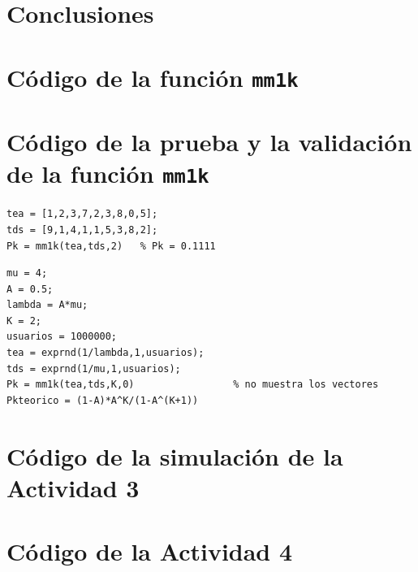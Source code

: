 \documentclass[12pt]{article}
\begin{document}
\section{Conclusiones}

\printbibliography[title={Referencias}]

\newpage
\appendix
\renewcommand{\lstlistingname}{Código}

\section{Código de la función \texttt{mm1k}}\label{anexo:mm1k}


\section{Código de la prueba y la validación de la función \texttt{mm1k}}\label{anexo:pruebas}

\begin{lstlisting}[caption={Prueba de \texttt{mm1k} con los vectores de clase.}]
tea = [1,2,3,7,2,3,8,0,5];
tds = [9,1,4,1,1,5,3,8,2];
Pk = mm1k(tea,tds,2)   % Pk = 0.1111
\end{lstlisting}

\begin{lstlisting}[caption={Validación de \texttt{mm1k} con tiempos exponenciales.}]
mu = 4;
A = 0.5;
lambda = A*mu;
K = 2;
usuarios = 1000000;
tea = exprnd(1/lambda,1,usuarios);
tds = exprnd(1/mu,1,usuarios);
Pk = mm1k(tea,tds,K,0)                 % no muestra los vectores
Pkteorico = (1-A)*A^K/(1-A^(K+1))
\end{lstlisting}

\section{Código de la simulación de la Actividad 3}\label{anexo:actividad3}


\section{Código de la Actividad 4}\label{anexo:actividad4}
\end{document}
